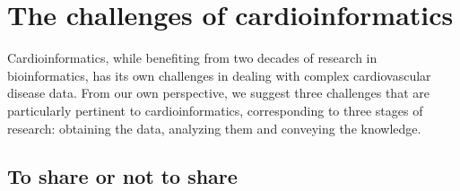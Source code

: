 \documentclass[letter]{bioinfo}
\newcommand{\comment}[1]{\textcolor{red}{#1}}
\begin{document}
	
	\section*{The challenges of cardioinformatics}
	Cardioinformatics, while benefiting from two decades of research in bioinformatics, has its own challenges in dealing with complex cardiovascular disease data. From our own perspective, we suggest three challenges that are particularly pertinent to cardioinformatics, corresponding to three stages of research: obtaining the data, analyzing them and conveying the knowledge.
	
	
	
	\subsection*{To share or not to share}
	
\end{document}
